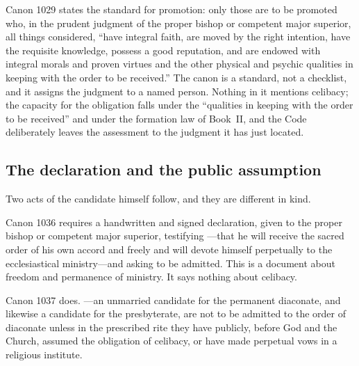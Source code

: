 Canon 1029 states the standard for promotion: only those are to be promoted who, in the prudent judgment of the proper bishop or competent major superior, all things considered, ``have integral faith, are moved by the right intention, have the requisite knowledge, possess a good reputation, and are endowed with integral morals and proven virtues and the other physical and psychic qualities in keeping with the order to be received.'' The canon is a standard, not a checklist, and it assigns the judgment to a named person. Nothing in it mentions celibacy; the capacity for the obligation falls under the ``qualities in keeping with the order to be received'' and under the formation law of Book~II, and the Code deliberately leaves the assessment to the judgment it has just located.

\subsection{The declaration and the public assumption}

Two acts of the candidate himself follow, and they are different in kind.

Canon 1036 requires a handwritten and signed declaration, given to the proper bishop or competent major superior, testifying ---that he will receive the sacred order of his own accord and freely and will devote himself perpetually to the ecclesiastical ministry---and asking to be admitted. This is a document about freedom and permanence of ministry. It says nothing about celibacy.

Canon 1037 does. ---an unmarried candidate for the permanent diaconate, and likewise a candidate for the presbyterate, are not to be admitted to the order of diaconate unless in the prescribed rite they have publicly, before God and the Church, assumed the obligation of celibacy, or have made perpetual vows in a religious institute.

